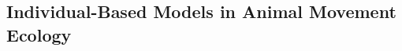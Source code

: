 \begin{refsection}[sorting=nyt]
{%


\subsection*{Individual-Based Models in Animal Movement Ecology}

}
\end{refsection}
